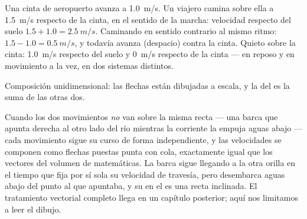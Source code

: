 \begin{example}\label{ex:g10:relative-motion:walkway}
Una cinta de aeropuerto avanza a \qty{1.0}{m/s}. Un viajero camina sobre
ella a \qty{1.5}{m/s} respecto de la cinta, en el sentido de la marcha:
velocidad respecto del suelo $1.5 + 1.0 = \qty{2.5}{m/s}$. Caminando en
sentido contrario al mismo ritmo: $1.5 - 1.0 = \qty{0.5}{m/s}$, y
todavía avanza (despacio) contra la cinta. Quieto sobre la cinta:
\qty{1.0}{m/s} respecto del suelo y \qty{0}{m/s} respecto de la cinta
--- en reposo y en movimiento a la vez, en dos sistemas distintos.
\end{example}

\begin{omfigure}

{\small Composición unidimensional: las flechas están dibujadas a
escala, y la del  es la suma de las otras dos.}
\end{omfigure}

\begin{remark}\label{rem:g10:relative-motion:twodim}
Cuando los dos movimientos \emph{no} van sobre la misma recta --- una
barca que apunta derecha al otro lado del río mientras la corriente la
empuja aguas abajo --- cada movimiento sigue su curso de forma
independiente, y las velocidades se componen como flechas puestas punta
con cola, exactamente igual que los vectores del volumen de
matemáticas. La barca sigue llegando a la otra orilla en el tiempo que
fija por sí sola su velocidad de travesía, pero desembarca aguas abajo
del punto al que apuntaba, y su  en el  es
una recta inclinada. El tratamiento vectorial completo llega en un
capítulo posterior; aquí nos limitamos a leer el dibujo.
\end{remark}


